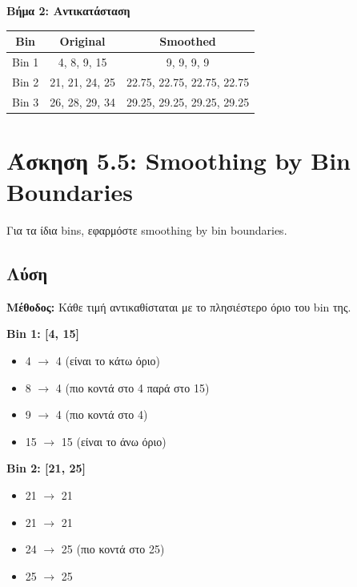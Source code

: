 \textbf{Βήμα 2: Αντικατάσταση}

\begin{center}
\begin{tabular}{ccc}
\toprule
\textbf{Bin} & \textbf{Original} & \textbf{Smoothed} \\
\midrule
Bin 1 & 4, 8, 9, 15 & 9, 9, 9, 9 \\
Bin 2 & 21, 21, 24, 25 & 22.75, 22.75, 22.75, 22.75 \\
Bin 3 & 26, 28, 29, 34 & 29.25, 29.25, 29.25, 29.25 \\
\bottomrule
\end{tabular}
\end{center}

\section{Άσκηση 5.5: Smoothing by Bin Boundaries}

\begin{formulabox}[Εκφώνηση]
Για τα ίδια bins, εφαρμόστε smoothing by bin boundaries.
\end{formulabox}

\subsection*{Λύση}

\textbf{Μέθοδος:} Κάθε τιμή αντικαθίσταται με το πλησιέστερο όριο του bin της.

\textbf{Bin 1: [4, 15]}
\begin{itemize}
    \item 4 $\to$ 4 (είναι το κάτω όριο)
    \item 8 $\to$ 4 (πιο κοντά στο 4 παρά στο 15)
    \item 9 $\to$ 4 (πιο κοντά στο 4)
    \item 15 $\to$ 15 (είναι το άνω όριο)
\end{itemize}

\textbf{Bin 2: [21, 25]}
\begin{itemize}
    \item 21 $\to$ 21
    \item 21 $\to$ 21
    \item 24 $\to$ 25 (πιο κοντά στο 25)
    \item 25 $\to$ 25
\end{itemize}

